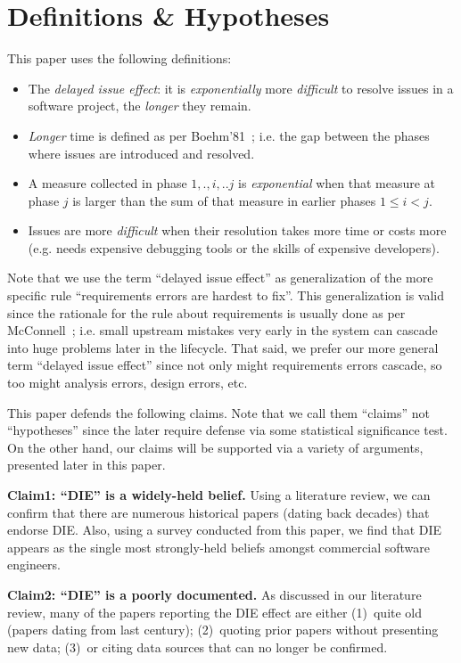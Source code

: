 \documentclass{sig-alternate}
\newcommand{\bi}{\begin{itemize}}%
\newcommand{\ei}{\end{itemize}}
\begin{document}
\section{Definitions \& Hypotheses}
This paper uses the following definitions:
\bi
\item
The {\em delayed issue effect}:   it is {\em exponentially}  more {\em difficult} to resolve  issues in a software project, the {\em longer} they remain.
\item
 {\em Longer} time is defined as per  Boehm'81~\cite{Boehm81}; i.e. the gap between the   phases where   issues are introduced and resolved.
\item
A measure collected in phase ${1,.,i,..j}$ is 
{\em exponential} when  that
   measure at phase $j$   
   is larger than the sum of that measure in 
earlier phases $1 \le i < j$. 
\item
Issues are more {\em difficult}  
when their resolution takes more time or costs more  (e.g. needs expensive
debugging tools or the skills of expensive developers).
\ei
Note that we use  the  term ``delayed issue effect'' as generalization of the
more specific rule  ``requirements errors are hardest to fix''.
This generalization is valid since the rationale for the rule about requirements
is usually done as per McConnell~\cite{mcconnell01}; i.e. small upstream mistakes very
early in the system can cascade into huge problems later in the lifecycle.
That said, we prefer our more general term ``delayed issue effect'' since not
only might requirements errors cascade, so too might analysis errors, design errors, etc.



This paper defends the  following claims. Note that we call them
``claims'' not ``hypotheses'' since the later require defense via some statistical
significance test. On the other hand, our claims will be supported via a variety
of arguments, presented later in this paper.

{\bf  Claim1: ``DIE'' is a  widely-held belief.}
Using a literature review, we can confirm that there are numerous historical papers (dating back decades)
that endorse DIE. Also, using a survey conducted from this paper, we find  that 
  DIE  appears as the
single most strongly-held beliefs amongst commercial software engineers.

{\bf  Claim2: ``DIE'' is a poorly documented.}
 As discussed in our literature review,  many of the papers reporting the DIE
effect are either (1)~quite old (papers dating from last century);
(2)~quoting prior papers without presenting   new data; 
(3)~or citing data sources that can no longer be
confirmed. 
\end{document}
